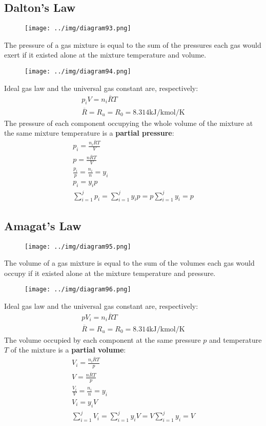 \documentclass[class=report, crop=false, 12pt,a4paper]{standalone}
\numberwithin{equation}{section}
\begin{document}
\subsection{Dalton's Law}
\begin{figure}[H]
  \centering
  \texttt{[image: ../img/diagram93.png]}
  \caption{}
\end{figure}
The pressure of a gas mixture is equal to the sum of the pressures each gas would exert if it existed alone at the mixture temperature and volume.
\begin{figure}[H]
  \centering
  \texttt{[image: ../img/diagram94.png]}
  \caption{}
\end{figure}
Ideal gas law and the universal gas constant are, respectively:
\begin{gather}
  p_iV = n_i\overline{R}T \\[5pt]
  \overline{R} = R_u = R_0 = 8.314 \si{\kilo\joule\per\kilo\mole\per\kelvin}
\end{gather}
The pressure of each component occupying the whole volume of the mixture at the same mixture temperature is a \textbf{partial pressure}:
\begin{gather}
  p_i = \frac{n_i \overline{R} T}{V} \\[5pt]
  p = \frac{n \overline{R} T}{V} \\[5pt]
  \frac{p_i}{p} = \frac{n_i}{n} = y_i \\[5pt]
  p_i = y_ip \\[5pt]
  \sum_{i=1}^{j}p_i = \sum_{i=1}^{j}y_ip = p\sum_{i=1}^{j}y_i = p
\end{gather}
\subsection{Amagat’s Law}
\begin{figure}[H]
  \centering
  \texttt{[image: ../img/diagram95.png]}
  \caption{}
\end{figure}
The volume of a gas mixture is equal to the sum of the volumes each gas would occupy if it existed alone at the mixture temperature and pressure.
\begin{figure}[H]
  \centering
  \texttt{[image: ../img/diagram96.png]}
  \caption{}
\end{figure}
Ideal gas law and the universal gas constant are, respectively:
\begin{gather}
  pV_i = n_i\overline{R}T \\[5pt]
  \overline{R} = R_u = R_0 = 8.314 \si{\kilo\joule\per\kilo\mole\per\kelvin}
\end{gather}
The volume occupied by each component at the same pressure $p$ and temperature $T$ of the mixture is a \textbf{partial volume}: 
\begin{gather}
  V_i = \frac{n_i \overline{R} T}{p} \\[5pt]
  V = \frac{n \overline{R} T}{p} \\[5pt]
  \frac{V_i}{V} = \frac{n_i}{n} = y_i \\[5pt]
  V_i = y_iV \\[5pt]
  \sum_{i=1}^{j}V_i = \sum_{i=1}^{j}y_iV = V\sum_{i=1}^{j}y_i = V
\end{gather}
\end{document}
